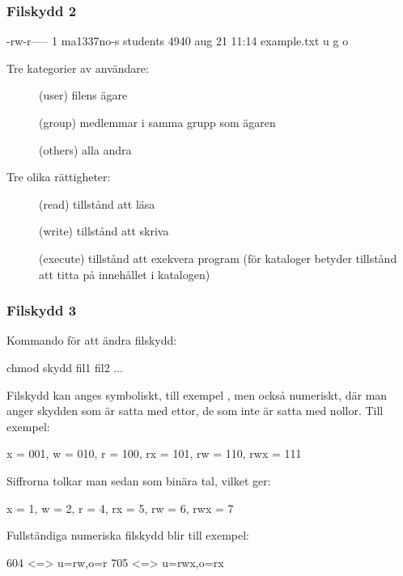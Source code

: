 \begin{frame}[fragile=singleslide]
    \frametitle{Filskydd 2}
    \begin{GobbleCode}{6}
        -rw-r-----  1 ma1337no-s  students  4940 aug 21 11:14 example.txt
          u  g  o
    \end{GobbleCode}

    Tre kategorier av användare:

    \begin{description}
        \item[] (user) filens ägare
        \item[] (group) medlemmar i samma grupp som ägaren
        \item[] (others) alla andra
    \end{description}

    Tre olika rättigheter:

    \begin{description}
        \item[] (read) tillstånd att läsa
        \item[] (write) tillstånd att skriva
        \item[] (execute) tillstånd att exekvera program (för kataloger betyder  tillstånd att titta på innehållet i katalogen)
    \end{description}

\end{frame}

\begin{frame}[fragile=singleslide]
    \frametitle{Filskydd 3}
    Kommando för att ändra filskydd:

    \begin{GobbleCode}{4}
        chmod skydd fil1 fil2 ...
    \end{GobbleCode}

    Filskydd kan anges symboliskt, till exempel , men också numeriskt, där man anger skydden som är satta med ettor, de som inte är satta med nollor. Till exempel:

    \begin{GobbleCode}{4}
        x = 001, w = 010, r = 100, rx = 101, rw = 110, rwx = 111
    \end{GobbleCode}


    Siffrorna tolkar man sedan som binära tal, vilket ger:

    \begin{GobbleCode}{4}
        x = 1, w = 2, r = 4, rx = 5, rw = 6, rwx = 7
    \end{GobbleCode}


    Fullständiga numeriska filskydd blir till exempel:

    \begin{GobbleCode}{4}
        604 <=> u=rw,o=r    705 <=> u=rwx,o=rx
    \end{GobbleCode}
\end{frame}

